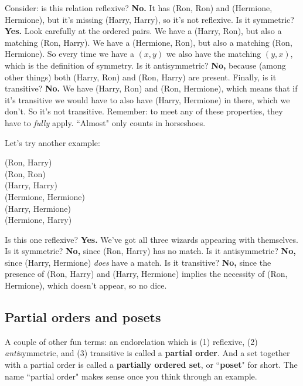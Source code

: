 Consider: is this relation reflexive? \textbf{No.} It has (Ron, Ron) and
(Hermione, Hermione), but it's missing (Harry, Harry), so it's not
reflexive. Is it symmetric? \textbf{Yes.} Look carefully at the ordered
pairs. We have a (Harry, Ron), but also a matching (Ron, Harry). We have a
(Hermione, Ron), but also a matching (Ron, Hermione). So every time we have
a $(x,y)$ we also have the matching $(y,x)$, which is the definition of
symmetry. Is it antisymmetric? \textbf{No,} because (among other things)
both (Harry, Ron) and (Ron, Harry) are present. Finally, is it transitive?
\textbf{No.} We have (Harry, Ron) and (Ron, Hermione), which means that if
it's transitive we would have to also have (Harry, Hermione) in there,
which we don't. So it's not transitive. Remember: to meet any of these
properties, they have to \textit{fully} apply. ``Almost" only counts in
horseshoes.

Let's try another example:

\begin{center}
(Ron, Harry) \\
(Ron, Ron) \\
(Harry, Harry) \\
(Hermione, Hermione) \\
(Harry, Hermione) \\
(Hermione, Harry)
\end{center}

Is this one reflexive? \textbf{Yes.} We've got all three wizards appearing
with themselves. Is it symmetric? \textbf{No,} since (Ron, Harry) has no
match. Is it antisymmetric? \textbf{No,} since (Harry, Hermione)
\textit{does} have a match. Is it transitive? \textbf{No,} since the
presence of (Ron, Harry) and (Harry, Hermione) implies the necessity of
(Ron, Hermione), which doesn't appear, so no dice.

\subsection{Partial orders and posets}

A couple of other fun terms: an endorelation which is (1) reflexive,
(2) \textit{anti}symmetric, and (3) transitive is called a \textbf{partial
order}. And a set together with a partial order is called a
\textbf{partially ordered set}, or ``\textbf{poset}" for short. The name
``partial order" makes sense once you think through an example.

